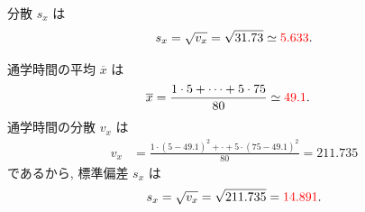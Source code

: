 \begin{qenumerate}
{\begin{enumerate}
{				分散 $s_{x}$ は
				\begin{align}
					s_{x} = \sqrt{v_{x}} = \sqrt{31.73} \simeq \textcolor{red}{5.633}.
				\end{align}
			}
		\end{enumerate}
	}
	\item{
		通学時間の平均 $\overline{x}$ は
		\begin{align}
			\overline{x} &= \frac{1\cdot 5 + \cdots + 5\cdot 75}{80} \simeq \textcolor{red}{49.1}.
		\end{align}
		通学時間の分散 $v_{x}$ は
		\begin{align}
			v_{x} &= \frac{1\cdot (5 - 49.1)^{2} + \cdot + 5\cdot (75 - 49.1)^{2}}{80} = 211.735
		\end{align}
		であるから, 標準偏差 $s_{x}$ は
		\begin{align}
			s_{x} = \sqrt{v_{x}} = \sqrt{211.735} = \textcolor{red}{14.891}.
		\end{align}
	}
\end{qenumerate}